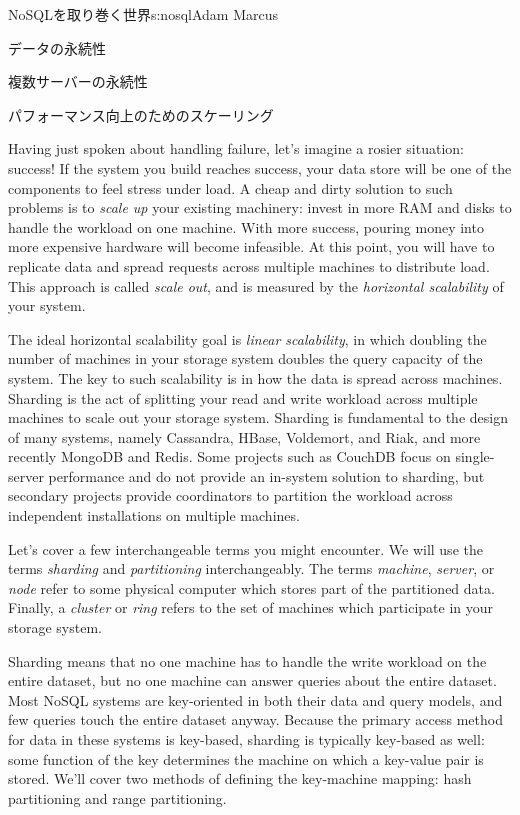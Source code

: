 \begin{aosachapter}{NoSQLを取り巻く世界}{s:nosql}{Adam Marcus}
\begin{aosasect1}{データの永続性}
\begin{aosasect2}{複数サーバーの永続性}
\end{aosasect2}

\end{aosasect1}

\begin{aosasect1}{パフォーマンス向上のためのスケーリング}

Having just spoken about handling failure, let's imagine a rosier
situation: success!  If the system you build reaches success, your
data store will be one of the components to feel stress under load.  A
cheap and dirty solution to such problems is to \emph{scale up} your
existing machinery: invest in more RAM and disks to handle the
workload on one machine.  With more success, pouring money into more
expensive hardware will become infeasible.  At this point, you will
have to replicate data and spread requests across multiple machines to
distribute load.  This approach is called \emph{scale out}, and is
measured by the \emph{horizontal scalability} of your system.

The ideal horizontal scalability goal is \emph{linear scalability}, in
which doubling the number of machines in your storage system doubles
the query capacity of the system.  The key to such scalability is in
how the data is spread across machines.  Sharding is the act of
splitting your read and write workload across multiple machines to
scale out your storage system.  Sharding is fundamental to the design
of many systems, namely Cassandra, HBase, Voldemort, and Riak, and
more recently MongoDB and Redis.  Some projects such as CouchDB focus
on single-server performance and do not provide an in-system solution
to sharding, but secondary projects provide coordinators to partition
the workload across independent installations on multiple machines.

Let's cover a few interchangeable terms you might encounter.  We will
use the terms \emph{sharding} and \emph{partitioning} interchangeably.
The terms \emph{machine}, \emph{server}, or \emph{node} refer to some
physical computer which stores part of the partitioned data.  Finally,
a \emph{cluster} or \emph{ring} refers to the set of machines which
participate in your storage system.

Sharding means that no one machine has to handle the write workload on
the entire dataset, but no one machine can answer queries about the
entire dataset.  Most NoSQL systems are key-oriented in both their
data and query models, and few queries touch the entire dataset
anyway.  Because the primary access method for data in these systems
is key-based, sharding is typically key-based as well: some function
of the key determines the machine on which a key-value pair is
stored.  We'll cover two methods of defining the key-machine mapping:
hash partitioning and range partitioning.


\end{aosasect1}
\end{aosachapter}
